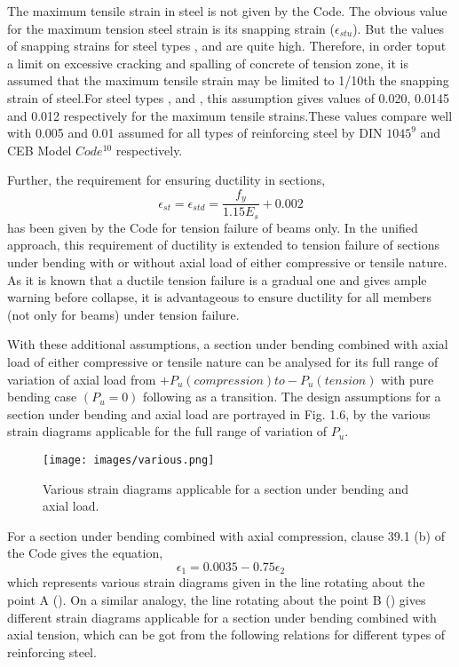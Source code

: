 The maximum tensile strain in steel is not given by the Code. The obvious
value for the maximum tension steel strain is its snapping strain
($\epsilon_{stu}$). But the values of snapping strains for steel types
{\fetwofivezero}, {\fefouronefive} and {\fefivezerozero} are quite high.
Therefore, in order toput a limit on excessive cracking and spalling of
concrete of tension zone, it is assumed that the maximum tensile strain
may be limited to 1/10th the snapping strain of steel.For steel types
{\fetwofivezero}, {\fefouronefive} and {\fefivezerozero}, this assumption
gives values of 0.020, 0.0145 and 0.012 respectively for the maximum
tensile strains.These values compare well with 0.005 and 0.01 assumed for 
all types of reinforcing steel by DIN $1045^9$ and CEB Model $Code^{10}$
respectively.

Further, the requirement for ensuring ductility in sections,
$$\epsilon_{st}=\epsilon_{std}=\frac{f_y}{1.15 E_s}+0.002$$
has been given by the Code for tension failure of beams only. In the
uniﬁed approach, this requirement of ductility is extended to tension
failure of sections under bending with or without axial load of either
compressive or tensile nature. As it is known that a ductile tension
failure is a gradual one and gives ample warning before collapse, it
is advantageous to ensure ductility for all members (not only for beams) 
under tension failure.

With these additional assumptions, a section under bending combined with
axial load of either compressive or tensile nature can be analysed for
its full range of variation of axial load from
$+P_u (compression) to -P_u (tension)$ with pure bending case $(P_u=0)$
following as a transition. The design assumptions for a section under
bending and axial load are portrayed in Fig. 1.6, by the various strain
diagrams applicable for the full range of variation of $P_u$.

\begin{figure}
\centering
\texttt{[image: images/various.png]}
\caption{Various strain diagrams applicable for a section under bending and axial load.}
\label{fig:various}
\end{figure}

For a section under bending combined with axial compression, clause
39.1 (b) of the Code gives the equation,
\begin{equation}
\epsilon_1=0.0035-0.75\epsilon_2
\end{equation}
which represents various strain diagrams given in the line rotating about
the point A (). On a similar analogy, the line rotating about the
point B () gives different strain diagrams applicable for a
section under bending combined with axial tension, which can be got from
the following relations for different types of reinforcing steel.

